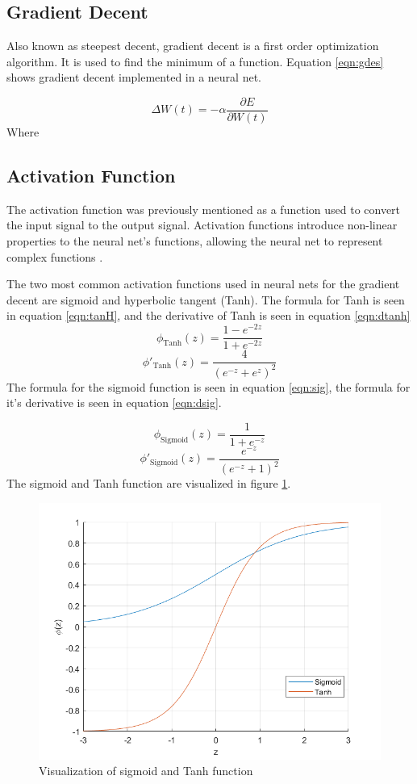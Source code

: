 \documentclass[12pt]{article}
\begin{document}
	\subsection{Gradient Decent}
	Also known as steepest decent, gradient decent is a first order optimization algorithm. It is used to find the minimum of a function. Equation \ref{eqn:gdes} shows gradient decent implemented in a neural net. 
	
	\begin{equation}
	\Delta W(t) = - \alpha \frac{\partial E}{\partial W(t)}
	\label{eqn:gdes}
	\end{equation}
	Where 
	
	\subsection{Activation Function}
	The activation function was previously mentioned as a function used to convert the input signal to the output signal. Activation functions introduce non-linear properties to the neural net's functions, allowing the neural net to represent complex functions \cite{nnBlog}. \par 
	The two most common activation functions used in neural nets for the gradient decent are sigmoid and hyperbolic tangent (Tanh). 
	The formula for Tanh is seen in equation \ref{eqn:tanH}, and the derivative of Tanh is seen in equation \ref{eqn:dtanh} 
	\begin{equation}
	\phi_{\text{Tanh}}(z)=\frac{1-e^{-2z}}{1+e^{-2z}}
	\label{eqn:tanH}
	\end{equation}
	\begin{equation}
	\phi'_{\text{Tanh}}(z)=\frac{4}{\left(e^{-z}+e^{z}\right)^2}
	\label{eqn:dtanh}
	\end{equation}
	The formula for the sigmoid function is seen in equation \ref{eqn:sig}, the formula for it's derivative is seen in equation \ref{eqn:dsig}.
	
	\begin{equation}
	\phi_{\text{Sigmoid}}(z)=\frac{1}{1+e^{-z}}
	\label{eqn:sig}
	\end{equation}
	\begin{equation}
	\phi'_{\text{Sigmoid}}(z)=\frac{e^{-z}}{\left(e^{-z}+1\right)^2}
	\label{eqn:dsig}
	\end{equation}
	The sigmoid and Tanh function are visualized in figure \ref{fig:sigvstanh}.
	
	\begin{figure}
		\centering
		\includegraphics[width=0.4\linewidth]{sigVsTanh}
		\caption{Visualization of sigmoid and Tanh function}
		\label{fig:sigvstanh}
	\end{figure}
\end{document}
